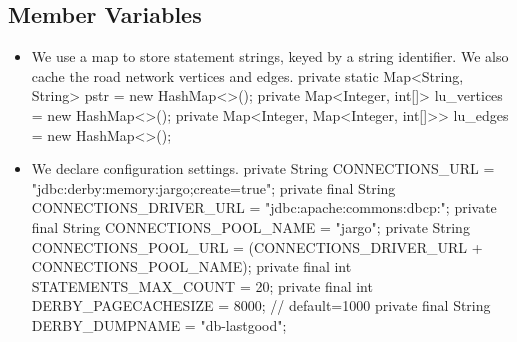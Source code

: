 \documentclass{article}
\def\nwendcode{\endtrivlist \endgroup}      %
\theoremstyle{definition}                   %
\begin{document}
\subsection{Member Variables}
\label{sec:member-variables}
\begin{itemize}
\item We use a map to store statement strings, keyed by a string identifier.
We also cache the road network vertices and edges.
\nwenddocs{}\endmoddef{}
private static Map<String, String> pstr = new HashMap<>();
private Map<Integer, int[]> lu_vertices = new HashMap<>();
private Map<Integer, Map<Integer, int[]>> lu_edges = new HashMap<>();
\eatline
{}\nwendcode{}\item We declare configuration settings.
\nwenddocs{}\plusendmoddef
private String CONNECTIONS_URL = "jdbc:derby:memory:jargo;create=true";
private final String CONNECTIONS_DRIVER_URL = "jdbc:apache:commons:dbcp:";
private final String CONNECTIONS_POOL_NAME = "jargo";
private String CONNECTIONS_POOL_URL = (CONNECTIONS_DRIVER_URL + CONNECTIONS_POOL_NAME);
private final int STATEMENTS_MAX_COUNT = 20;
private final int DERBY_PAGECACHESIZE = 8000;  // default=1000
private final String DERBY_DUMPNAME = "db-lastgood";
\eatline

\end{itemize}
\end{document}
